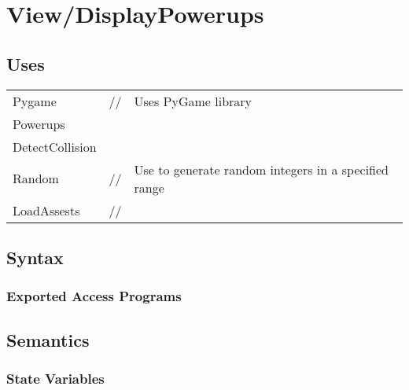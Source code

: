 \documentclass[12pt]{article}
\begin{document}
\section*{View/DisplayPowerups}

\subsection* {Uses}

\begin{tabular}{lll}
    Pygame & // & Uses PyGame library\\
    Powerups   \\
    DetectCollision \\
    Random & // & Use to generate random integers in a specified range\\
    LoadAssests & // & \\
    
\end{tabular}

\subsection* {Syntax}

\subsubsection* {Exported Access Programs}


\subsection* {Semantics}

\subsubsection* {State Variables}
\end{document}
